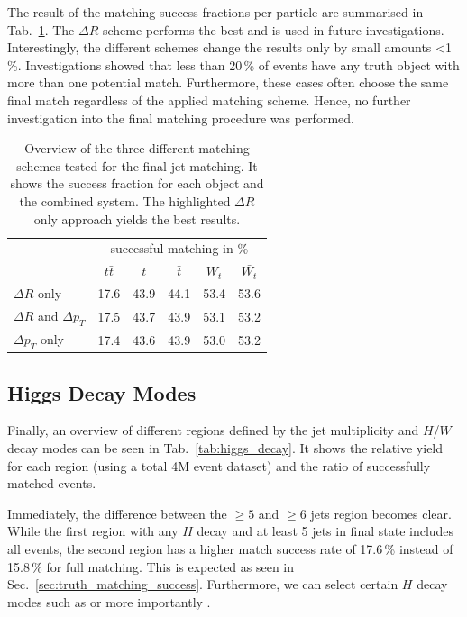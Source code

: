 \documentclass[bachelor,ngerman,english]{GAUBM}
\begin{document}
The result of the matching success fractions per particle are summarised in Tab.~\ref{tab:final_selection}. The $\Delta R$ scheme performs the best and is used in future investigations. Interestingly, the different schemes change the results only by small amounts <1\,\%. Investigations showed that less than 20\,\% of events have any truth object with more than one potential match. Furthermore, these cases often choose the same final match regardless of the applied matching scheme. Hence, no further investigation into the final matching procedure was performed. 

\begin{table}
    \centering
    \caption{Overview of the three different matching schemes tested for the final jet matching. It shows the success fraction for each object and the combined \ttbar system. The highlighted $\Delta R$ only approach yields the best results.}
    \begin{tabular}{l|c|c|c|c|c|}
        &\multicolumn{5}{c|}{successful matching in \%}\\
        & $t\bar{t}$ & $t$ & $\bar{t}$ & $W_t$ & $\bar{W_t}$\\
        \hline
        \rowcolor{gray!40}
        $\Delta R$ only & 17.6 & 43.9 & 44.1 & 53.4 & 53.6\\
        $\Delta R$ and $\Delta p_T$ & 17.5 & 43.7 & 43.9 & 53.1 & 53.2\\
        $\Delta p_T$ only & 17.4 & 43.6 & 43.9 & 53.0 & 53.2\\
    \end{tabular}
    \label{tab:final_selection}
\end{table}

\subsection{Higgs Decay Modes}
\label{sec:status:higgs_decay}
Finally, an overview of different regions defined by the jet multiplicity and $H$/$W$ decay modes can be seen in Tab.~\ref{tab:higgs_decay}. It shows the relative yield for each region (using a total 4M event dataset) and the ratio of successfully matched events.

Immediately, the difference between the $\geq5$ and $\geq6$ jets region becomes clear. While the first region with any $H$ decay and at least 5 jets in final state includes all events, the second region has a higher match success rate of 17.6\,\% instead of 15.8\,\% for full \ttbar matching. This is expected as seen in Sec.~\ref{sec:truth_matching_success}. Furthermore, we can select certain $H$ decay modes such as \Hbb or more importantly \HWW.
\end{document}
